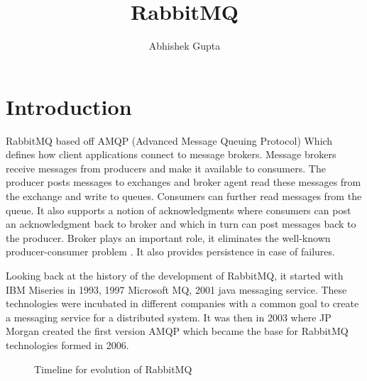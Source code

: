 \documentclass[9pt,twocolumn,twoside]{../../styles/osajnl}
\title{RabbitMQ}
\author[1,*]{Abhishek Gupta}
\affil[1]{School of Informatics and Computing, Bloomington, IN 47408, U.S.A.}
\affil[*]{Corresponding authors: abhigupt@iu.edu}
\begin{document}
\maketitle

\section{Introduction}
RabbitMQ \cite{www-rabbitmq-pivotal} based off AMQP (Advanced Message Queuing
Protocol\cite{vinoski2006advanced}) Which defines how client applications
connect to message brokers. Message brokers receive messages from producers and
make it available to consumers. The producer posts messages to exchanges and
broker agent read these messages from the exchange and write to queues.
Consumers can further read messages from the queue. It also supports a notion of
acknowledgments where consumers can post an acknowledgment back to broker and
which in turn can post messages back to the producer. Broker plays an important
role, it eliminates the well-known producer-consumer problem
\cite{www-producer-consumer-wiki}. It also provides persistence in case of
failures.

Looking back at the history \cite{videla2012rabbitmq} of the development of
RabbitMQ, it started with IBM Miseries in 1993, 1997 Microsoft MQ, 2001 java
messaging service. These technologies were incubated in different companies with
a common goal to create a messaging service for a distributed system. It was
then in 2003 where JP Morgan created the first version AMQP which became the
base for RabbitMQ technologies formed in 2006.

\begin{figure}[htbp]
\centering
{}
\caption{Timeline for evolution of RabbitMQ \cite{videla2012rabbitmq}}
\label{fig:false-color}
\end{figure}
\end{document}
